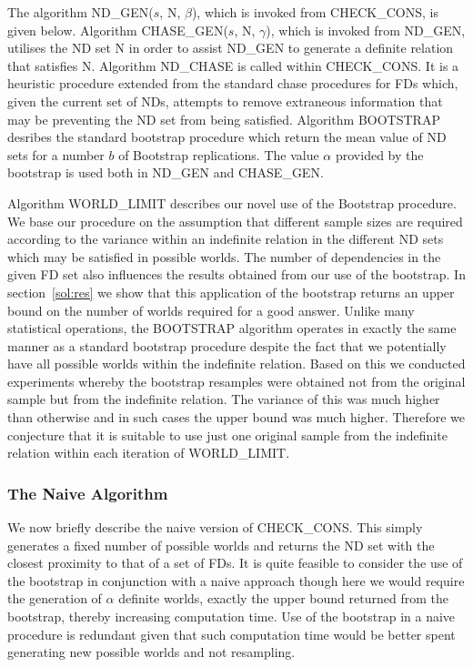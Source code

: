 The algorithm ND\_GEN($s$, N, $\beta$), which is invoked from CHECK\_CONS, 
is given below. Algorithm CHASE\_GEN($s$, N, $\gamma$),
which is invoked from ND\_GEN,
utilises the ND set N in order to assist ND\_GEN
to generate a definite relation that satisfies N. Algorithm ND\_CHASE is
called within CHECK\_CONS. It is a heuristic procedure extended from the
standard chase procedures for FDs \cite{bv84,Mann92} which, given the
current set of NDs, attempts to remove extraneous information that
may be preventing the ND set from being satisfied. Algorithm BOOTSTRAP
desribes the standard bootstrap procedure which return the mean value
of ND sets for a number $b$ of Bootstrap replications. The value $\alpha$
provided by the bootstrap is used both in ND\_GEN and CHASE\_GEN.

\medskip

 Algorithm
WORLD\_LIMIT describes our novel use of the Bootstrap procedure. We
base our procedure on the assumption that different sample sizes are
required according to the variance within an indefinite relation in
the different ND sets which may be satisfied in possible
worlds. The number of dependencies in the given FD set also influences
the results obtained from our use of the bootstrap. In section~\ref{sol:res}
we show that this application of the bootstrap returns an upper bound on 
the number of worlds required for a good answer. Unlike many statistical
operations, the BOOTSTRAP
algorithm operates in exactly the same manner as a standard bootstrap
procedure despite the fact that we potentially have all possible worlds
within the indefinite relation.  Based on this we conducted experiments
whereby the bootstrap resamples were obtained not from the original
sample but from the indefinite relation. The variance of this was much
higher than otherwise and in such cases the upper bound was much higher.
Therefore we conjecture that it is suitable to use just one original sample
from the indefinite relation within each iteration of WORLD\_LIMIT.


\medskip

\subsubsection{The Naive Algorithm}

We now briefly describe the naive version of CHECK\_CONS. This simply
generates a fixed number of possible worlds and returns the ND set with
the closest proximity to that of a set of FDs.
It is quite feasible to consider the use of the bootstrap in conjunction
with a naive approach though here we would require the generation of 
$\alpha$ definite worlds, exactly the upper bound returned from the
bootstrap, thereby increasing computation time. Use of the bootstrap
in a naive procedure is redundant given that such computation time
would be better spent generating new possible worlds and not
resampling.


